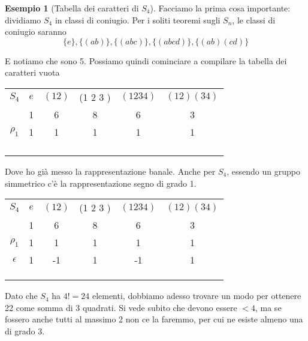 \documentclass[11pt]{article}
\theoremstyle{plain}
\theoremstyle{definition}
\newtheorem{exmp}{Esempio}[section]
\theoremstyle{remark}
\begin{document}
\begin{exmp}[Tabella dei caratteri di $S_4$]
Facciamo la prima cosa importante: dividiamo $S_4$ in classi di coniugio. Per i soliti teoremi sugli $S_n$, le classi di coniugio saranno 
\[\{e\}, \{(a b)\}, \{(a b c)\}, \{(a b c d)\}, \{(a b)(c d)\}\]

E notiamo che sono 5. Possiamo quindi cominciare a compilare la tabella dei caratteri vuota



\begin{table}[!ht]
\centering
\begin{tabular}{|c|c|c|c|c|c|}
\hline
$S_4$  & $e$ & $(1 2)$ & (1 2 3 ) & $(1 2 3 4)$ & $(1 2)(3 4)$ \\
 & 1 & 6 & 8 & 6 & 3 \\
\hline
 $\rho_1$ & 1 & 1  & 1 & 1 & 1\\
\hline
& &  & & & \\
\hline
& &  & & & \\
\hline
& &  & & & \\
\hline
& &  & & & \\
\hline
\end{tabular}
\end{table}


Dove ho già messo la rappresentazione banale. Anche per $S_4$, essendo un gruppo simmetrico c'è la rappresentazione segno di grado 1. 




\begin{table}[!ht]
\centering
\begin{tabular}{|c|c|c|c|c|c|}
\hline
$S_4$  & $e$ & $(1 2)$ & (1 2 3 ) & $(1 2 3 4)$ & $(1 2)(3 4)$ \\
 & 1 & 6 & 8 & 6 & 3 \\
\hline
 $\rho_1$ & 1 & 1  & 1 & 1 & 1\\
\hline
$\epsilon$ & 1  & -1 & 1 & -1 & 1 \\
\hline
& &  & & & \\
\hline
& &  & & & \\
\hline
& &  & & & \\
\hline
\end{tabular}
\end{table}

Dato che $S_4$ ha $4! = 24$ elementi, dobbiamo adesso trovare un modo per ottenere 22 come somma di 3 quadrati. Si vede subito che devono essere $ <4 $, ma se fossero anche tutti al massimo 2 non ce la faremmo, per cui ne esiste almeno una di grado 3.


\end{exmp}
\end{document}
